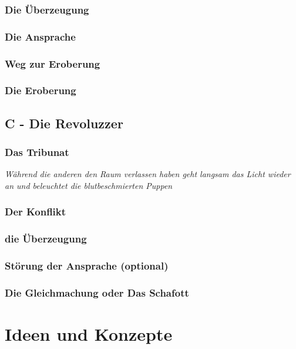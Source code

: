 \documentclass[a4paper, 12pt]{report}
\newcommand\backmatter{ \cleardoublepage \pagenumbering{roman}}
\begin{document}
\subsection{Die Überzeugung}

\subsection{Die Ansprache}

\subsection{Weg zur Eroberung}

\subsection{Die Eroberung}

\section{C - Die Revoluzzer}

\subsection{Das Tribunat}
\textit{Während die anderen den Raum verlassen haben geht langsam das Licht wieder an und beleuchtet die blutbeschmierten Puppen}

\subsection{Der Konflikt}

\subsection{die Überzeugung}

\subsection{Störung der Ansprache (optional)}

\subsection{Die Gleichmachung oder Das Schafott}


\backmatter

\chapter* {Ideen und Konzepte}\label{ideen_konzepte}
\end{document}
